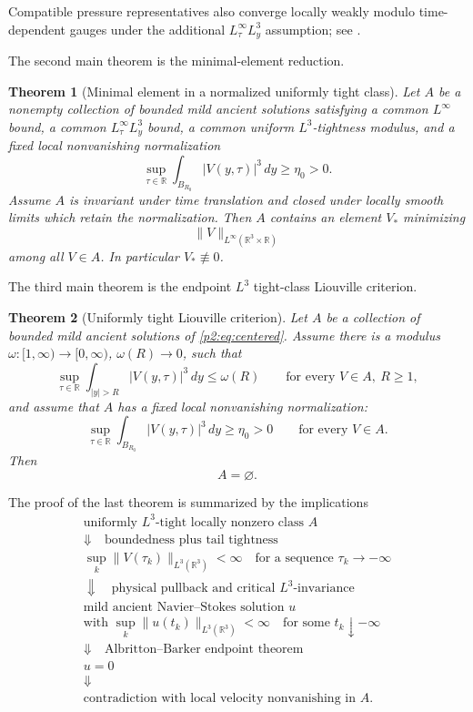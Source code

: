 \documentclass[11pt]{amsart}
\theoremstyle{plain}
\newtheorem{theorem}{Theorem}[section]
\theoremstyle{definition}
\theoremstyle{remark}
\numberwithin{equation}{section}
\newcommand{\R}{\mathbb R}
\begin{document}
Compatible pressure representatives also converge locally weakly modulo
time-dependent gauges under the additional \(L^\infty_\tau L^3_y\) assumption;
see .

The second main theorem is the minimal-element reduction.

\begin{theorem}[Minimal element in a normalized uniformly tight class]
\label{p2:thm:minimal-tight-intro}
Let \(A\) be a nonempty collection of bounded mild ancient solutions satisfying
a common \(L^\infty\) bound, a common \(L^\infty_\tau L^3_y\) bound, a common
uniform \(L^3\)-tightness modulus, and a fixed local nonvanishing
normalization
\[
   \sup_{\tau\in\R}\int_{B_{R_0}}|V(y,\tau)|^3\,dy\ge \eta_0>0.
\]
Assume \(A\) is invariant under time translation and closed under locally
smooth limits which retain the normalization.  Then \(A\) contains an element
\(V_*\) minimizing
\[
   \|V\|_{L^\infty(\R^3\times\R)}
\]
among all \(V\in A\).  In particular \(V_*\not\equiv0\).
\end{theorem}

The third main theorem is the endpoint \(L^3\) tight-class Liouville
criterion.

\begin{theorem}[Uniformly tight Liouville criterion]
\label{p2:thm:tight-liouville-intro}
Let \(A\) be a collection of bounded mild ancient solutions of
\eqref{p2:eq:centered}.  Assume there is a modulus
\(\omega:[1,\infty)\to[0,\infty)\), \(\omega(R)\to0\), such that
\[
   \sup_{\tau\in\R}
   \int_{|y|>R}|V(y,\tau)|^3\,dy\le\omega(R)
   \qquad\text{for every }V\in A,\ R\ge1,
\]
and assume that \(A\) has a fixed local nonvanishing normalization:
\[
   \sup_{\tau\in\R}\int_{B_{R_0}}|V(y,\tau)|^3\,dy\ge\eta_0>0
   \qquad\text{for every }V\in A.
\]
Then
\[
   A=\varnothing .
\]
\end{theorem}

The proof of the last theorem is summarized by the implications
\[
\begin{array}{c}
\text{uniformly \(L^3\)-tight locally nonzero class }A\\[2mm]
\Downarrow\quad\text{boundedness plus tail tightness}\\[2mm]
\sup_k\|V(\tau_k)\|_{L^3(\R^3)}<\infty
\quad\text{for a sequence }\tau_k\to-\infty\\[2mm]
\Downarrow\quad\text{physical pullback and critical \(L^3\)-invariance}\\[2mm]
\text{mild ancient Navier--Stokes solution }u\\[1mm]
\text{with }\sup_k\|u(t_k)\|_{L^3(\R^3)}<\infty
\quad\text{for some }t_k\downarrow-\infty\\[2mm]
\Downarrow\quad\text{Albritton--Barker endpoint theorem}\\[2mm]
u=0\\[2mm]
\Downarrow\\[2mm]
\text{contradiction with local velocity nonvanishing in }A .
\end{array}
\]
\end{document}
